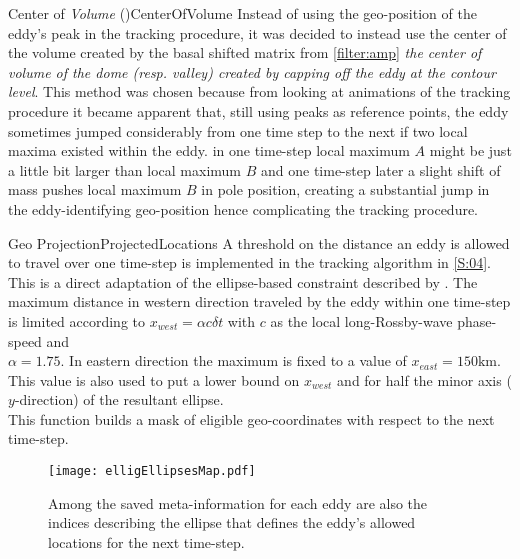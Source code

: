 \begin{filter}{Center of \textit{Volume} (\CoV)}{CenterOfVolume}
\label{filter:CoV}
Instead of using the geo-position of the eddy's peak in the tracking procedure,
it was decided to instead use the center of the volume created by the basal
shifted matrix from \cref{filter:amp} \ie \textit{the center of volume of the
dome
(resp. valley) created by capping off the eddy at the contour level}.
This method was chosen because from looking at animations of the tracking
procedure
it became apparent that, still using peaks as reference points, the eddy
sometimes jumped considerably from one time step to the next if two local maxima
existed within the eddy. \Eg in one time-step local maximum $A$ might be just a
little bit larger than local maximum $B$ and one time-step later a slight shift
of mass pushes local maximum $B$ in pole position, creating a substantial jump
in the eddy-identifying geo-position hence complicating the tracking procedure.
\end{filter}\newline
\begin{filter}{Geo Projection}{ProjectedLocations}
\label{filter:projLocs}
A threshold on the distance an eddy is allowed to travel over one time-step is implemented in the tracking algorithm in \cref{S:04}. This is a direct adaptation of the ellipse-based constraint described by \citet{Chelton2011}. The maximum distance in western direction traveled by the eddy within one time-step is limited according to $x_{west} = \alpha c \delta{t} $ with $c$ as the local long-Rossby-wave phase-speed and \\ \eg $\alpha=1.75$. In eastern direction the maximum is fixed to a value of \eg $x_{east} = 150\mathrm{km}$. This value is also used to put a lower bound on $x_{west}$ and for half the minor axis ($y$-direction) of the resultant ellipse.   \\
This function builds a mask of eligible geo-coordinates with respect to the next time-step.
\end{filter}\newline

\begin{figure}
		\texttt{[image: elligEllipsesMap.pdf]}
		\caption{Among the saved meta-information for each eddy are also the indices describing the ellipse that defines the eddy's allowed locations for the next time-step.}
		\label{fig:elligEllipse}
\end{figure}
